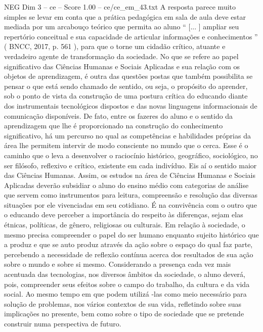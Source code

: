 \begin{textsample}{NEG Dim 3 – ce – Score 1.00 – ce/ce\_em\_43.txt}
A resposta parece muito simples se levar em conta que a prática pedagógica em sala de aula deve estar mediada por um arcabouço teórico que permita ao aluno “ [... ] ampliar seu repertório conceitual e sua capacidade de articular informações e conhecimentos ” ( BNCC, 2017, p. 561 ), para que o torne um cidadão crítico, atuante e verdadeiro agente de transformação da sociedade.
No que se refere ao papel significativo das Ciências Humanas e Sociais Aplicadas e sua relação com os objetos de aprendizagem, é outra das questões postas que também possibilita se pensar o que está sendo chamado de sentido, ou seja, o propósito do aprender, sob o ponto de vista da construção de uma postura crítica do educando diante dos instrumentais tecnológicos dispostos e das novas linguagens informacionais de comunicação disponíveis.
De fato, entre os fazeres do aluno e o sentido da aprendizagem que lhe é proporcionado na construção do conhecimento significativo, há um percurso no qual as competências e habilidades próprias da área lhe permitem intervir de modo consciente no mundo que o cerca.
Esse é o caminho que o leva a desenvolver o raciocínio histórico, geográfico, sociológico, no ser filósofo, reflexivo e crítico, existente em cada indivíduo.
Eis aí o sentido maior das Ciências Humanas.
Assim, os estudos na área de Ciências Humanas e Sociais Aplicadas deverão subsidiar o aluno do ensino médio com categorias de análise que servem como instrumentos para leitura, compreensão e resolução das diversas situações por ele vivenciadas em seu cotidiano.
É na convivência com o outro que o educando deve perceber a importância do respeito às diferenças, sejam elas étnicas, políticas, de gênero, religiosas ou culturais.
Em relação à sociedade, o mesmo precisa compreender o papel do ser humano enquanto sujeito histórico que a produz e que se auto produz através da ação sobre o espaço do qual faz parte, percebendo a necessidade de reflexão contínua acerca dos resultados de sua ação sobre o mundo e sobre si mesmo.
Considerando a presença cada vez mais acentuada das tecnologias, nos diversos âmbitos da sociedade, o aluno deverá, pois, compreender seus efeitos sobre o campo do trabalho, da cultura e da vida social.
Ao mesmo tempo em que podem utilizá -las como meio necessário para solução de problemas, nos vários contextos de sua vida, refletindo sobre suas implicações no presente, bem como sobre o tipo de sociedade que se pretende construir numa perspectiva de futuro.

\end{textsample}
